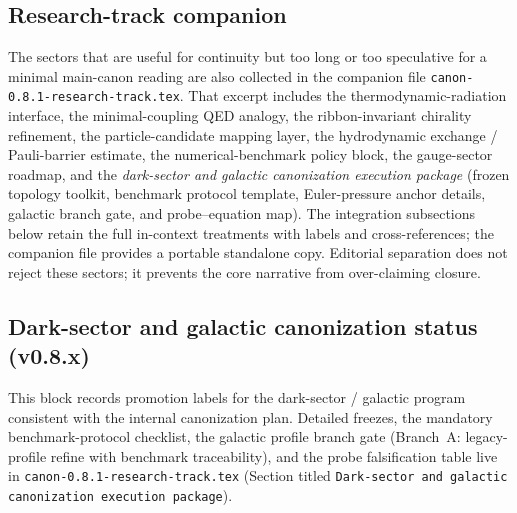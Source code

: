 \documentclass[11pt]{article}
\theoremstyle{definition}
\theoremstyle{plain}
\theoremstyle{remark}
\begin{document}
    \subsection{Research-track companion}
        The sectors that are useful for continuity but too long or too speculative for a minimal main-canon reading are also collected in the companion file \texttt{canon-0.8.1-research-track.tex}. That excerpt includes the thermodynamic-radiation interface, the minimal-coupling QED analogy, the ribbon-invariant chirality refinement, the particle-candidate mapping layer, the hydrodynamic exchange / Pauli-barrier estimate, the numerical-benchmark policy block, the gauge-sector roadmap, and the \emph{dark-sector and galactic canonization execution package} (frozen topology toolkit, benchmark protocol template, Euler-pressure anchor details, galactic branch gate, and probe--equation map). The integration subsections below retain the full in-context treatments with labels and cross-references; the companion file provides a portable standalone copy. Editorial separation does not reject these sectors; it prevents the core narrative from over-claiming closure.

    \subsection{Dark-sector and galactic canonization status (v0.8.x)}
        \label{sec:dark-canonicalization-status}

        This block records promotion labels for the dark-sector / galactic program consistent with the internal canonization plan. Detailed freezes, the mandatory benchmark-protocol checklist, the galactic profile branch gate (Branch~A: legacy-profile refine with benchmark traceability), and the probe falsification table live in \texttt{canon-0.8.1-research-track.tex} (Section titled \texttt{Dark-sector and galactic canonization execution package}).
\end{document}

